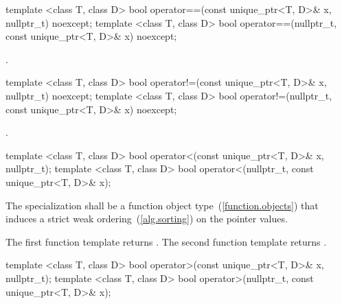 %
%
\begin{itemdecl}
template <class T, class D>
  bool operator==(const unique_ptr<T, D>& x, nullptr_t) noexcept;
template <class T, class D>
  bool operator==(nullptr_t, const unique_ptr<T, D>& x) noexcept;
\end{itemdecl}

\begin{itemdescr}
\pnum
\returns {}.
\end{itemdescr}

%
%
\begin{itemdecl}
template <class T, class D>
  bool operator!=(const unique_ptr<T, D>& x, nullptr_t) noexcept;
template <class T, class D>
  bool operator!=(nullptr_t, const unique_ptr<T, D>& x) noexcept;
\end{itemdecl}

\begin{itemdescr}
\pnum
\returns {}.
\end{itemdescr}

%
%
\begin{itemdecl}
template <class T, class D>
  bool operator<(const unique_ptr<T, D>& x, nullptr_t);
template <class T, class D>
  bool operator<(nullptr_t, const unique_ptr<T, D>& x);
\end{itemdecl}

\begin{itemdescr}
\pnum
\requires The specialization  shall be
a function object type~(\ref{function.objects}) that induces a strict weak
ordering~(\ref{alg.sorting}) on the pointer values.

\pnum
\returns
The first function template returns
.
The second function template returns
.
\end{itemdescr}

%
%
\begin{itemdecl}
template <class T, class D>
  bool operator>(const unique_ptr<T, D>& x, nullptr_t);
template <class T, class D>
  bool operator>(nullptr_t, const unique_ptr<T, D>& x);
\end{itemdecl}

